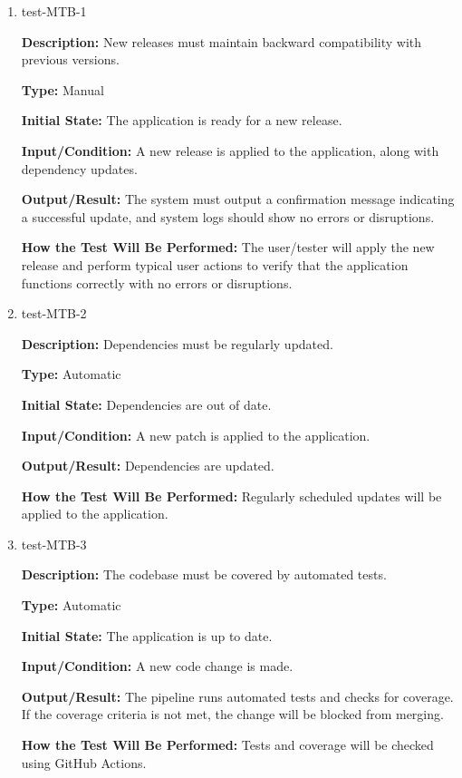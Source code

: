 \documentclass[12pt, titlepage]{article}
\begin{document}
\begin{enumerate}

\item{test-MTB-1\\}

\textbf{Description:} New releases must maintain backward compatibility with
previous versions.

\textbf{Type:} Manual
					
\textbf{Initial State:} The application is ready for a new release.
					
\textbf{Input/Condition:} A new release is applied to the application, along
with dependency updates.
					
\textbf{Output/Result:} The system must output a confirmation message indicating
a successful update, and system logs should show no errors or disruptions.
					
\textbf{How the Test Will Be Performed:} The user/tester will apply the new
release and perform typical user actions to verify that the application
functions correctly with no errors or disruptions.

\item{test-MTB-2\\}

\textbf{Description:} Dependencies must be regularly updated.

\textbf{Type:} Automatic
					
\textbf{Initial State:} Dependencies are out of date.
					
\textbf{Input/Condition:} A new patch is applied to the application.
					
\textbf{Output/Result:} Dependencies are updated.
					
\textbf{How the Test Will Be Performed:} Regularly scheduled updates will be
applied to the application.

\item{test-MTB-3\\}

\textbf{Description:} The codebase must be covered by automated tests.

\textbf{Type:} Automatic
					
\textbf{Initial State:} The application is up to date.
					
\textbf{Input/Condition:} A new code change is made.
					
\textbf{Output/Result:} The pipeline runs automated tests and checks for
coverage. If the coverage criteria is not met, the change will be blocked from
merging.
					
\textbf{How the Test Will Be Performed:} Tests and coverage will be checked using
GitHub Actions.

\end{enumerate}
\end{document}
